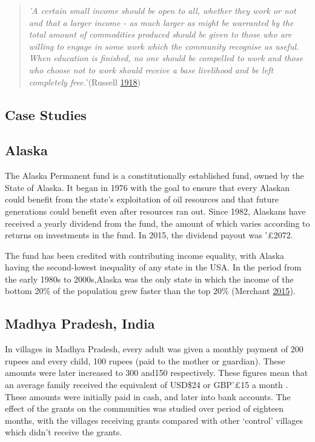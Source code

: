 \documentclass[]{tufte-handout}
\begin{document}
\begin{quote}
\emph{'A certain small income should be open to all, whether they work
or not and that a larger income - as much larger as might be warranted
by the total amount of commodities produced should be given to those who
are willing to engage in some work which the community recognise as
useful. When education is finished, no one should be compelled to work
and those who choose not to work should receive a base livelihood and be
left completely free.}'(Russell
\protect\hyperlink{ref-BertrandRussell1918}{1918})
\end{quote}

\hypertarget{case-studies}{%
\subsection{Case Studies}\label{case-studies}}

\hypertarget{alaska}{%
\subsection{Alaska}\label{alaska}}

The Alaska Permanent fund is a constitutionally established fund, owned
by the State of Alaska. It began in 1976 with the goal to ensure that
every Alaskan could benefit from the state's exploitation of oil
resources and that future generations could benefit even after resources
ran out. Since 1982, Alaskans have received a yearly dividend from the
fund, the amount of which varies according to returns on investments in
the fund. In 2015, the dividend payout was '£2072.

The fund has been credited with contributing income equality, with
Alaska having the second-lowest inequality of any state in the USA. In
the period from the early 1980s to 2000s,Alaska was the only state in
which the income of the bottom 20\% of the population grew faster than
the top 20\% (Merchant \protect\hyperlink{ref-BrianMerchant2015}{2015}).

\hypertarget{madhya-pradesh-india}{%
\subsection{Madhya Pradesh, India}\label{madhya-pradesh-india}}

In villages in Madhya Pradesh, every adult was given a monthly payment
of 200 rupees and every child, 100 rupees (paid to the mother or
guardian). These amounts were later increased to 300 and150
respectively. These figures mean that an average family received the
equivalent of USD\$24 or GBP'£15 a month . These amounts were initially
paid in cash, and later into bank accounts. The effect of the grants on
the communities was studied over period of eighteen months, with the
villages receiving grants compared with other `control' villages which
didn't receive the grants.
\end{document}
